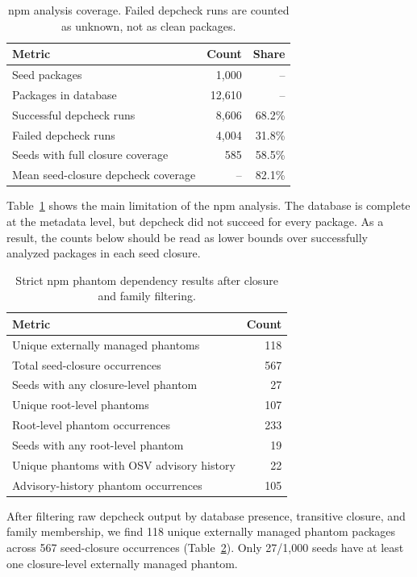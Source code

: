 \documentclass[letterpaper,twocolumn,10pt]{article}
\newcommand{\npm}{npm\xspace}
\begin{document}
\begin{table}[t]
\centering
\small
\begin{tabular}{lrr}
\toprule
Metric & Count & Share \\
\midrule
Seed packages & 1,000 & -- \\
Packages in database & 12,610 & -- \\
Successful depcheck runs & 8,606 & 68.2\% \\
Failed depcheck runs & 4,004 & 31.8\% \\
Seeds with full closure coverage & 585 & 58.5\% \\
Mean seed-closure depcheck coverage & -- & 82.1\% \\
\bottomrule
\end{tabular}
\caption{npm analysis coverage. Failed depcheck runs are counted as unknown,
not as clean packages.}
\label{tab:npm-coverage}
\end{table}

Table~\ref{tab:npm-coverage} shows the main limitation of the \npm analysis.
The database is complete at the metadata level, but depcheck did not succeed for
every package.  As a result, the counts below should be read as lower bounds
over successfully analyzed packages in each seed closure.

\begin{table}[t]
\centering
\small
\begin{tabular}{lr}
\toprule
Metric & Count \\
\midrule
Unique externally managed phantoms & 118 \\
Total seed-closure occurrences & 567 \\
Seeds with any closure-level phantom & 27 \\
Unique root-level phantoms & 107 \\
Root-level phantom occurrences & 233 \\
Seeds with any root-level phantom & 19 \\
Unique phantoms with OSV advisory history & 22 \\
Advisory-history phantom occurrences & 105 \\
\bottomrule
\end{tabular}
\caption{Strict npm phantom dependency results after closure and family
filtering.}
\label{tab:npm-results}
\end{table}

After filtering raw depcheck output by database presence, transitive closure,
and family membership, we find 118 unique externally managed phantom packages
across 567 seed-closure occurrences (Table~\ref{tab:npm-results}).  Only
27/1,000 seeds have at least one closure-level externally managed phantom.
\end{document}

